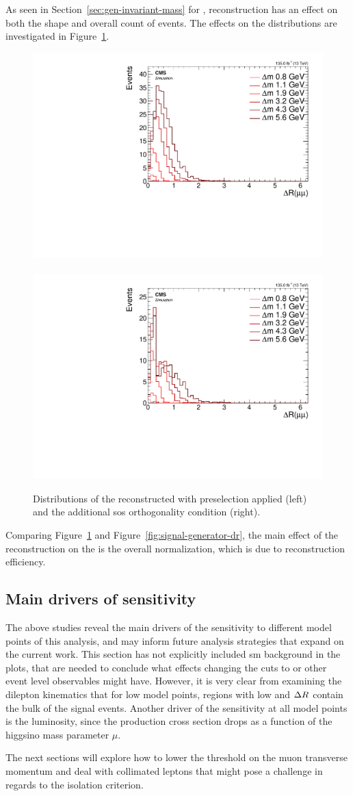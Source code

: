 As seen in Section~\ref{sec:gen-invariant-mass} for \mmumu, reconstruction has an effect on both the shape and overall count of events. The effects on the \drmm distributions are investigated in Figure~\ref{fig:reco-signal-dr}.

\begin{figure}[!htb]
\centering
\includegraphics[width=0.48\linewidth]{plots/signal_muons/none_deltaRCorrJetNoMultIso10Dr0.6.pdf} \,
\includegraphics[width=0.48\linewidth]{plots/signal_muons/none_deltaRCorrJetNoMultIso10Dr0.6_orth.pdf}  \\
\caption[Distributions of the reconstructed \drmm in signal events]{ Distributions of the reconstructed \drmm with preselection applied (left) and the additional \gls{sos} orthogonality condition (right).}
\label{fig:reco-signal-dr}
\end{figure}

Comparing Figure~\ref{fig:reco-signal-dr} and Figure~\ref{fig:signal-generator-dr}, the main effect of the reconstruction on the \drmm is the overall normalization, which is due to reconstruction efficiency.

\clearpage 
\subsection{Main drivers of sensitivity}

The above studies reveal the main drivers of the sensitivity to different model points of this analysis, and may inform future analysis strategies that expand on the current work. This section has not explicitly included \gls{sm} background in the plots, that are needed to conclude what effects changing the cuts to \MET or other event level observables might have. However, it is very clear from examining the dilepton kinematics that for low \dm model points, regions with low \pt and $\Delta R$ contain the bulk of the signal events. Another driver of the sensitivity at all \dm model points is the luminosity, since the production cross section drops as a function of the higgsino mass parameter $\mu$.

The next sections will explore how to lower the threshold on the muon transverse momentum and deal with collimated leptons that might pose a challenge in regards to the isolation criterion.
